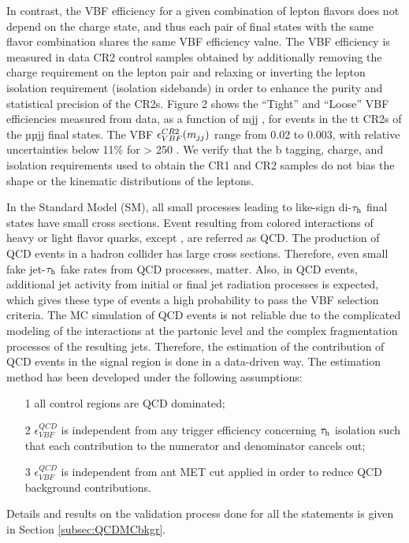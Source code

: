 In contrast, the VBF efficiency for a given combination of lepton flavors does not depend on the charge state, and thus each pair of final states with the same flavor combination shares the same VBF efficiency value. The VBF efficiency is measured in data CR2 control samples obtained by additionally removing the charge requirement on the lepton pair and relaxing or inverting the lepton isolation requirement (isolation
sidebands) in order to enhance the purity and statistical precision of the CR2s. Figure 2 shows the “Tight” and “Loose” VBF efficiencies measured from data, as a function of mjj , for events in the tt CR2s of the µµjj final states. The VBF $\epsilon^{CR2}_{VBF}(m_{jj})$ range from 0.02 to 0.003, with relative uncertainties below 11\% for \mjj > 250 \gev. We verify that the b tagging, charge, and isolation requirements used to obtain the CR1 and CR2 samples do not bias the \mjj shape or the kinematic distributions of the leptons.

In the Standard Model (SM), all small processes leading to like-sign di-$\tau_{\text{h}}$ final states have small cross sections. Event resulting from colored interactions of heavy or light flavor quarks, except \ttbar, are referred as QCD. The production of QCD events in a hadron collider has large cross sections. Therefore, even small fake jet-$\tau_{\text{h}}$ fake rates from QCD processes, matter. Also, in QCD events, additional jet activity from initial or final jet radiation processes is expected, which gives these type of events a high probability to pass the VBF selection criteria.
The MC simulation of QCD events is not reliable due to the complicated modeling of the interactions at the partonic level and the complex fragmentation processes of the resulting jets. Therefore, the estimation of the contribution of QCD events in the signal region is done in a data-driven way. The estimation method has been developed under the following assumptions:
\begin{itemize}
	\item[1] all control regions are QCD dominated;
	\item[2] $\epsilon^{QCD}_{VBF}$ is independent from any trigger efficiency concerning $\tau_{\text{h}}$ isolation such that each contribution to the numerator and denominator cancels out;
	\item[3] $\epsilon^{QCD}_{VBF}$ is independent from ant MET cut applied in order to reduce QCD background contributions. 
\end{itemize}

Details and results on the validation process done for all the statements is given in Section \ref{subsec:QCDMCbkgr}.

